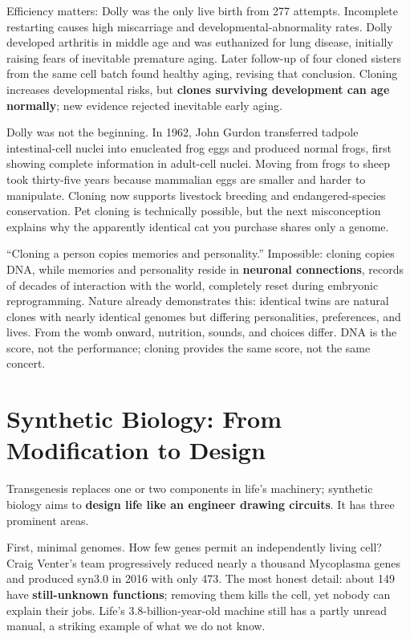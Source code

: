 Efficiency matters: Dolly was the only live birth from 277 attempts. Incomplete restarting causes high miscarriage and developmental-abnormality rates. Dolly developed arthritis in middle age and was euthanized for lung disease, initially raising fears of inevitable premature aging. Later follow-up of four cloned sisters from the same cell batch found healthy aging, revising that conclusion. Cloning increases developmental risks, but \textbf{clones surviving development can age normally}; new evidence rejected inevitable early aging.

Dolly was not the beginning. In 1962, John Gurdon transferred tadpole intestinal-cell nuclei into enucleated frog eggs and produced normal frogs, first showing complete information in adult-cell nuclei. Moving from frogs to sheep took thirty-five years because mammalian eggs are smaller and harder to manipulate. Cloning now supports livestock breeding and endangered-species conservation. Pet cloning is technically possible, but the next misconception explains why the apparently identical cat you purchase shares only a genome.

\begin{wuqu}
``Cloning a person copies memories and personality.'' Impossible: cloning copies DNA, while memories and personality reside in \textbf{neuronal connections}, records of decades of interaction with the world, completely reset during embryonic reprogramming. Nature already demonstrates this: identical twins are natural clones with nearly identical genomes but differing personalities, preferences, and lives. From the womb onward, nutrition, sounds, and choices differ. DNA is the score, not the performance; cloning provides the same score, not the same concert.
\end{wuqu}

\section{Synthetic Biology: From Modification to Design}

Transgenesis replaces one or two components in life's machinery; synthetic biology aims to \textbf{design life like an engineer drawing circuits}. It has three prominent areas.

First, minimal genomes. How few genes permit an independently living cell? Craig Venter's team progressively reduced nearly a thousand Mycoplasma genes and produced syn3.0 in 2016 with only 473. The most honest detail: about 149 have \textbf{still-unknown functions}; removing them kills the cell, yet nobody can explain their jobs. Life's 3.8-billion-year-old machine still has a partly unread manual, a striking example of what we do not know.

